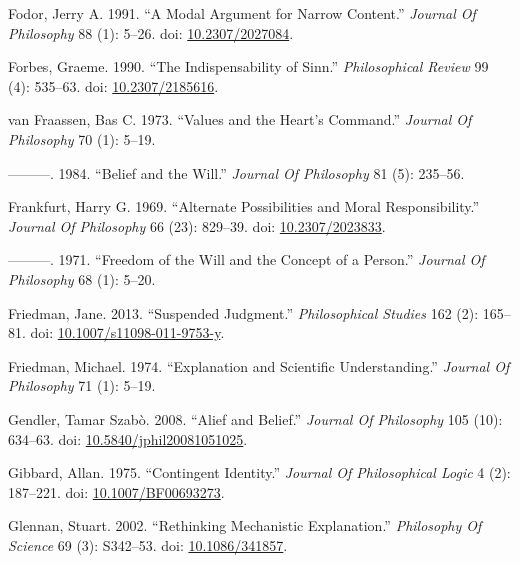 \documentclass[
  10pt,
  letterpaper,
  DIV=11,
  numbers=noendperiod,
  twoside]{scrartcl}
\newlength{\cslhangindent}
\newenvironment{CSLReferences}[2] %
 {\begin{list}{}{%
  \setlength{\itemindent}{0pt}
  \setlength{\leftmargin}{0pt}
  \setlength{\parsep}{0pt}
  \ifodd #1
   \setlength{\leftmargin}{\cslhangindent}
   \setlength{\itemindent}{-1\cslhangindent}
  \fi
  \setlength{\itemsep}{#2\baselineskip}}}
 {\end{list}}
\begin{document}
\begin{CSLReferences}{1}{0}
Fodor, Jerry A. 1991. {``A Modal Argument for Narrow Content.''}
\emph{Journal Of Philosophy} 88 (1): 5--26. doi:
\href{https://doi.org/10.2307/2027084}{10.2307/2027084}.

Forbes, Graeme. 1990. {``The Indispensability of Sinn.''}
\emph{Philosophical Review} 99 (4): 535--63. doi:
\href{https://doi.org/10.2307/2185616}{10.2307/2185616}.

van Fraassen, Bas C. 1973. {``Values and the Heart's Command.''}
\emph{Journal Of Philosophy} 70 (1): 5--19.

---------. 1984. {``Belief and the Will.''} \emph{Journal Of Philosophy}
81 (5): 235--56.

Frankfurt, Harry G. 1969. {``Alternate Possibilities and Moral
Responsibility.''} \emph{Journal Of Philosophy} 66 (23): 829--39. doi:
\href{https://doi.org/10.2307/2023833}{10.2307/2023833}.

---------. 1971. {``Freedom of the Will and the Concept of a Person.''}
\emph{Journal Of Philosophy} 68 (1): 5--20.

Friedman, Jane. 2013. {``Suspended Judgment.''} \emph{Philosophical
Studies} 162 (2): 165--81. doi:
\href{https://doi.org/10.1007/s11098-011-9753-y}{10.1007/s11098-011-9753-y}.

Friedman, Michael. 1974. {``Explanation and Scientific Understanding.''}
\emph{Journal Of Philosophy} 71 (1): 5--19.

Gendler, Tamar Szabò. 2008. {``Alief and Belief.''} \emph{Journal Of
Philosophy} 105 (10): 634--63. doi:
\href{https://doi.org/10.5840/jphil20081051025}{10.5840/jphil20081051025}.

Gibbard, Allan. 1975. {``Contingent Identity.''} \emph{Journal Of
Philosophical Logic} 4 (2): 187--221. doi:
\href{https://doi.org/10.1007/BF00693273}{10.1007/BF00693273}.

Glennan, Stuart. 2002. {``Rethinking Mechanistic Explanation.''}
\emph{Philosophy Of Science} 69 (3): S342--53. doi:
\href{https://doi.org/10.1086/341857}{10.1086/341857}.


\end{CSLReferences}
\end{document}
